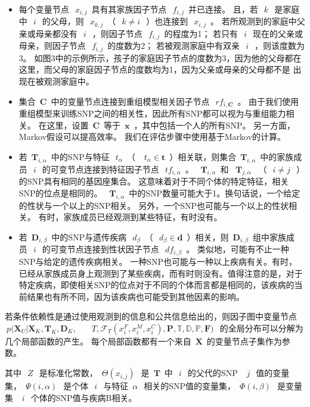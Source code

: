\begin{itemize}
	\item 每个变量节点~$~x_{i,j}$~具有其家族因子节点~$~f_{i,j}$~并已连接。 且，若~$~k~$~是家庭中~$~i~$~的父母，则~$~x_{k,j}$~（~$~ k \neq i~$~）也连接到~$~x_{i,j}$~。 若所观测到的家庭中父亲或母亲都没有~$~i~$~，则因子节点~$~f_{i,j}$~的程度为1； 若只有~$~i~$~现在的父亲或母亲，则因子节点~$~f_{i,j}$~的度数为2； 若被观测家庭中有双亲~$~i~$~，则该度数为3。 如图3中的示例所示，孩子的家庭因子节点的度数为3，因为他的父母都在这里，而父母的家庭因子节点的度数均为1，因为父亲或母亲的父母都不是 出现在被观测家庭中。
	\item 集合~$\mathbf{C}$~中的变量节点连接到重组模型相关因子节点~$~rf_{i,\mathbf{C}}$~。 由于我们使用重组模型来训练SNP之间的相关性，因此所有SNP都可以视为与重组能力相关。 在这里，设置~$\mathbf{C}$~等于~$\mathbf{x}$~，其中包括一个人的所有SNP。 另一方面，Markov假设可以提高效率。 我们在评估步骤中使用基于Markov的计算。
	\item 若~$\mathbf{T}_{i,\alpha}$~中的SNP与特征~$~t_{\alpha}$~（ ~$~t_{\alpha} \in \mathbf{t}$~）相关联，则集合~$\mathbf{T}_{i,\alpha}$~中的家族成员~$~i~$~的可变节点连接到特征因子节点~$~tf_{i,\alpha}$~。 ~$\mathbf{T}_{i,\alpha}$~和 ~$\mathbf{T}_{j,\alpha}$~ （~$~i \neq j~$~）的SNP具有相同的基因座集合。 这意味着对于不同个体的特定特征，相关SNP的位点是相同的。 ~$\mathbf{T}_{i,\alpha}$~中的SNP数量可能大于1。换句话说，一个给定的性状与一个以上的SNP相关。 另外，一个SNP也可能与一个以上的性状相关。 有时，家族成员已经观测到某些特征，有时没有。
	\item 若~$\mathbf{D}_{i,\beta}$~中的SNP与遗传疾病~$~d_{\beta}$~（~$~d_{\beta} \in \mathbf{d}$~）相关，则~$\mathbf{D}_{i,\beta}$~组中家族成员~$~i~$~的可变节点连接到性状因子节点~$~df_{i,\beta}$~。 类似地，可能有不止一种SNP与给定的遗传疾病相关。 一种SNP也可能与一种以上疾病有关。有时，已经从家族成员身上观测到了某些疾病，而有时则没有。值得注意的是，对于特定疾病，即使相关SNP的位点对于不同的个体而言都是相同的，该疾病的当前结果也有所不同，因为该疾病也可能受到其他因素的影响。
	
\end{itemize}


若条件依赖性是通过使用观测到的信息和公共信息给出的，则因子图中变量节点~$~p(\mathbf{X}_U | \mathbf{X}_K, \mathbf{T}_K,\mathbf{D}_K,~$~ ~$~T, \mathcal{F}_T(x_i^F, x_i^M, x_i^C), \mathbf{P}, \mathbb{T}, \mathbb{D}, \mathbb{P}, \mathbf{F})~$~的全局分布可以分解为几个局部函数的产生。 每个局部函数都有一个来自~$\mathbf{X}$~的变量节点子集作为参数。


其中~$~Z~$~是标准化常数，~$\Theta(x_{i,j})~$~是~$\mathbf{T}$~中~$~i~$~的父代的SNP ~$~j~$~值的变量集，~$\Psi(i,\alpha)~$~是个体~$~i~$~与特征~$\alpha~$~相关的SNP值的变量集，~$\Phi(i,\beta)~$~是变量集 ~$~i~$~个体的SNP值与疾病B相关。

